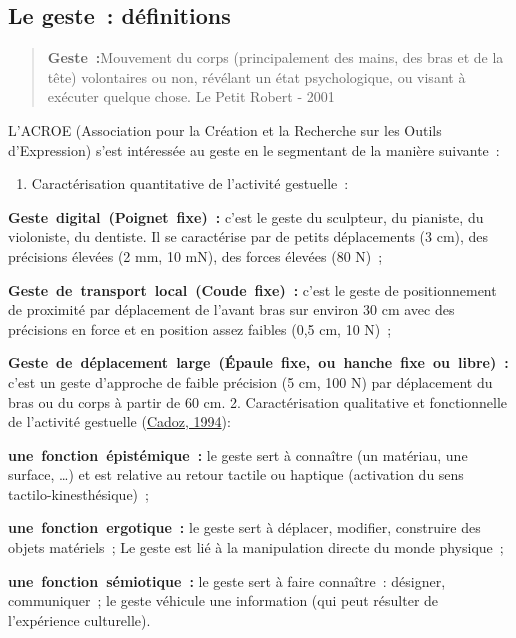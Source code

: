 \documentclass[
]{book}
\providecommand{\tightlist}{%
  \setlength{\itemsep}{0pt}\setlength{\parskip}{0pt}}
\begin{document}
\hypertarget{duxe9finitions}{%
\subsection{Le geste~: définitions}\label{duxe9finitions}}

\begin{quote}
\textbf{Geste~:}Mouvement du corps
(principalement des mains, des bras et de la tête) volontaires
ou non, révélant un état psychologique, ou visant à exécuter
quelque chose.
Le Petit Robert - 2001
\end{quote}

L'ACROE (Association pour la Création et la Recherche sur les Outils
d'Expression) s'est intéressée au geste en le segmentant de la manière
suivante~:

\begin{enumerate}
\def\labelenumi{\arabic{enumi}.}
\tightlist
\item
  Caractérisation quantitative de l'activité
  gestuelle~:
\end{enumerate}

\textbf{Geste~digital~(Poignet~fixe)~:}
c'est le geste du sculpteur, du pianiste, du
violoniste, du dentiste. Il se caractérise par de petits déplacements
(3 cm), des précisions élevées (2 mm, 10 mN), des forces élevées (80
N)~;

\textbf{Geste~de~transport~local~(Coude~fixe)~:}
c'est le geste de positionnement de
proximité par déplacement de l'avant bras sur environ 30 cm avec des
précisions en force et en position assez faibles (0,5 cm, 10 N)~;

\textbf{Geste~de~déplacement~large~(Épaule~fixe,~ou~hanche~fixe~ou~libre)~:}
c'est un geste d'approche de faible
précision (5 cm, 100 N) par déplacement du bras ou du corps à partir de
60 cm.
2. Caractérisation qualitative et fonctionnelle de
l'activité gestuelle (\protect\hyperlink{ref-cadoz1994realites}{Cadoz, 1994}):

\textbf{une~fonction~épistémique~:}
le geste sert à connaître (un matériau, une
surface, \ldots) et est relative au retour tactile ou haptique (activation
du sens tactilo-kinesthésique)~;

\textbf{une~fonction~ergotique~:}
le geste sert à déplacer, modifier,
construire des objets matériels~; Le geste est lié à la manipulation
directe du monde physique~;

\textbf{une~fonction~sémiotique~:}
le geste sert à faire connaître~: désigner,
communiquer~; le geste véhicule une information (qui peut résulter de
l'expérience culturelle).
\end{document}
